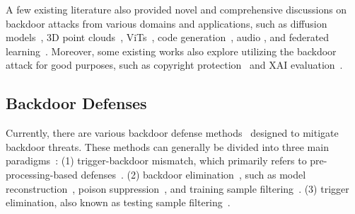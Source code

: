A few existing literature also provided novel and comprehensive discussions on backdoor attacks from various domains and applications, such as diffusion models~\citep{chou2024villandiffusion}, 3D point clouds~\citep{wei2024pointncbw}, ViTs~\citep{yang2024not}, code generation~\citep{yang2024stealthy}, audio \citep{zhai2021backdoor,cai2024towards}, and federated learning~\citep{shao2024fedtracker}. Moreover, some existing works also explore utilizing the backdoor attack for good purposes, such as copyright protection~\citep{li2022untargeted,li2023black,guo2023domain,guo2024zero,li2025reliable} and XAI evaluation~\citep{ya2023towards}.


\subsection{Backdoor Defenses}

Currently, there are various backdoor defense methods~\citep{li2024purifying, li2024nearest} designed to mitigate backdoor threats. These methods can generally be divided into three main paradigms~\citep{li2022backdoor}: (1) trigger-backdoor mismatch, which primarily refers to pre-processing-based defenses~\citep{liu2017neural, li2021backdoor, shi2023black}. (2) backdoor elimination~\citep{li2021neural,zhao2020Bridging,zeng2021rethinking,zeng2022adversarial,huang2022backdoor,xu2024towards}, such as model reconstruction~\citep{wang2020practical,li2021neural, zeng2022adversarial}, poison suppression~\citep{huang2022backdoor,tang2023setting}, and training sample filtering~\citep{hayase2020spectre, zeng2021rethinking}. (3) trigger elimination, also known as testing sample filtering~\citep{gao2019strip,xie2024badexpert,yi2025probe}.

